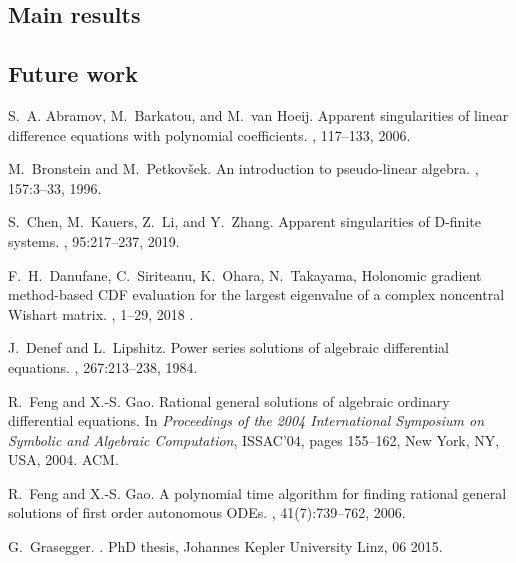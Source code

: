 \documentclass[10pt,a4paper]{article}
\begin{document}
\subsection{Main results}

\subsection{Future work}




\begin{thebibliography}{10}

S.~A. Abramov, M.~Barkatou, and M.~van Hoeij.
\newblock Apparent singularities of linear difference equations with polynomial
  coefficients.
, 117--133, 2006.


M.~Bronstein and M.~Petkov{\v{s}}ek.
\newblock An introduction to pseudo-linear algebra.
, 157:3--33, 1996.
  
S.~Chen, M.~Kauers, Z.~Li, and Y.~Zhang.
\newblock Apparent singularities of {D}-finite systems.
, 95:217--237, 2019.
  
F.~H.~Danufane, C.~Siriteanu, K.~Ohara, N.~Takayama,
\newblock Holonomic gradient method-based CDF evaluation for the largest eigenvalue
of a complex noncentral Wishart matrix.
, 1--29, 2018 .

J.~Denef and L.~Lipshitz.
\newblock Power series solutions of algebraic differential equations.
, 267:213--238, 1984.

R.~Feng and X.-S. Gao.
\newblock Rational general solutions of algebraic ordinary differential
  equations.
\newblock In {\em Proceedings of the 2004 International Symposium on Symbolic
  and Algebraic Computation}, ISSAC'04, pages 155--162, New York, NY, USA,
  2004. ACM.

R.~Feng and X.-S. Gao.
\newblock A polynomial time algorithm for finding rational general solutions of
  first order autonomous {ODEs}.
, 41(7):739--762, 2006.



G.~Grasegger.
.
\newblock PhD thesis, Johannes Kepler University Linz, 06 2015.




\end{thebibliography}
\end{document}
